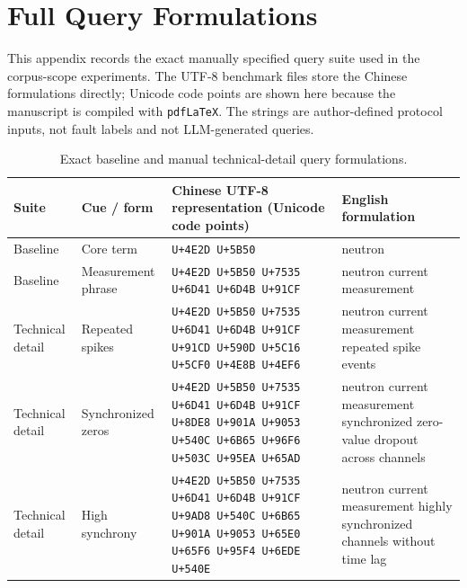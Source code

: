 \appendix
\onecolumn
\setcounter{table}{0}
\setcounter{figure}{0}
\renewcommand{\thetable}{\Alph{section}.\arabic{table}}
\renewcommand{\thefigure}{\Alph{section}.\arabic{figure}}
\renewcommand{\theHtable}{appendix.\Alph{section}.\arabic{table}}
\renewcommand{\theHfigure}{appendix.\Alph{section}.\arabic{figure}}
\section{Full Query Formulations}
\label{app:query-formulations}

This appendix records the exact manually specified query suite used in the corpus-scope experiments. The UTF-8 benchmark files store the Chinese formulations directly; Unicode code points are shown here because the manuscript is compiled with \texttt{pdfLaTeX}. The strings are author-defined protocol inputs, not fault labels and not LLM-generated queries.

\begin{table}[H]
  \centering
  \caption{Exact baseline and manual technical-detail query formulations.}
  \label{tab:appendix-queries}
  \scriptsize
  \setlength{\tabcolsep}{3pt}
  \begin{tabular}{@{}p{}p{}p{}p{}@{}}
    \toprule
    Suite & Cue / form & Chinese UTF-8 representation (Unicode code points) & English formulation \\
    \midrule
    Baseline & Core term &
    \texttt{U+4E2D U+5B50} &
    neutron \\
    Baseline & Measurement phrase &
    \texttt{U+4E2D U+5B50 U+7535 U+6D41 U+6D4B U+91CF} &
    neutron current measurement \\
    \midrule
    Technical detail & Repeated spikes &
    \texttt{U+4E2D U+5B50 U+7535 U+6D41 U+6D4B U+91CF U+91CD U+590D U+5C16 U+5CF0 U+4E8B U+4EF6} &
    neutron current measurement repeated spike events \\
    Technical detail & Synchronized zeros &
    \texttt{U+4E2D U+5B50 U+7535 U+6D41 U+6D4B U+91CF U+8DE8 U+901A U+9053 U+540C U+6B65 U+96F6 U+503C U+95EA U+65AD} &
    neutron current measurement synchronized zero-value dropout across channels \\
    Technical detail & High synchrony &
    \texttt{U+4E2D U+5B50 U+7535 U+6D41 U+6D4B U+91CF U+9AD8 U+540C U+6B65 U+901A U+9053 U+65E0 U+65F6 U+95F4 U+6EDE U+540E} &
    neutron current measurement highly synchronized channels without time lag \\
    \bottomrule
  \end{tabular}
\end{table}

\clearpage
\twocolumn
